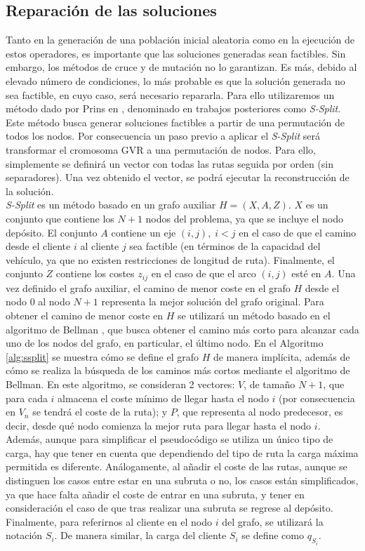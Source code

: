 \subsection{Reparación de las soluciones}
Tanto en la generación de una población inicial aleatoria como en la ejecución de estos operadores, es importante que las soluciones generadas sean factibles. Sin embargo, los métodos de cruce y de mutación no lo garantizan. Es más, debido al elevado número de condiciones, lo más probable es que la solución generada no sea factible, en cuyo caso, será necesario repararla. Para ello utilizaremos un método dado por Prins en \cite{prins-2003}, denominado en trabajos posteriores como \textit{S-Split}. Este método busca generar soluciones factibles a partir de una permutación de todos los nodos. Por consecuencia un paso previo a aplicar el \textit{S-Split} será transformar el cromosoma GVR a una permutación de nodos. Para ello, simplemente se definirá un vector con todas las rutas seguida por orden (sin separadores). Una vez obtenido el vector, se podrá ejecutar la reconstrucción de la solución.\\

\textit{S-Split} es un método basado en un grafo auxiliar $H=(X,A,Z)$. $X$ es un conjunto que contiene los $N+1$ nodos del problema, ya que se incluye el nodo depósito. El conjunto $A$ contiene un eje $(i,j),\;i<j$ en el caso de que el camino desde el cliente $i$ al cliente $j$ sea factible (en términos de la capacidad del vehículo, ya que no existen restricciones de longitud de ruta). Finalmente, el conjunto $Z$ contiene los costes $z_{ij}$ en el caso de que el arco $(i,j)$ esté en $A$. Una vez definido el grafo auxiliar, el camino de menor coste en el grafo $H$ desde el nodo $0$ al nodo $N+1$ representa la mejor solución del grafo original. Para obtener el camino de menor coste en $H$ se utilizará un método basado en el algoritmo de Bellman \cite{bellman}, que busca obtener el camino más corto para alcanzar cada uno de los nodos del grafo, en particular, el último nodo. En el Algoritmo \ref{alg:ssplit} se muestra cómo se define el grafo $H$ de manera implícita, además de cómo se realiza la búsqueda de los caminos más cortos mediante el algoritmo de Bellman. En este algoritmo, se consideran 2 vectores: $V$, de tamaño $N+1$, que para cada $i$ almacena el coste mínimo de llegar hasta el nodo $i$ (por consecuencia en $V_n$ se tendrá el coste de la ruta); y $P$, que representa al nodo predecesor, es decir, desde qué nodo comienza la mejor ruta para llegar hasta el nodo $i$. Además, aunque para simplificar el pseudocódigo se utiliza un único tipo de carga, hay que tener en cuenta que dependiendo del tipo de ruta la carga máxima permitida es diferente. Análogamente, al añadir el coste de las rutas, aunque se distinguen los casos entre estar en una subruta o no, los casos están simplificados, ya que hace falta añadir el coste de entrar en una subruta, y tener en consideración el caso de que tras realizar una subruta se regrese al depósito. Finalmente, para referirnos al cliente en el nodo $i$ del grafo, se utilizará la notación $S_i$. De manera similar, la carga del cliente $S_i$ se define como $q_{S_i}$.

